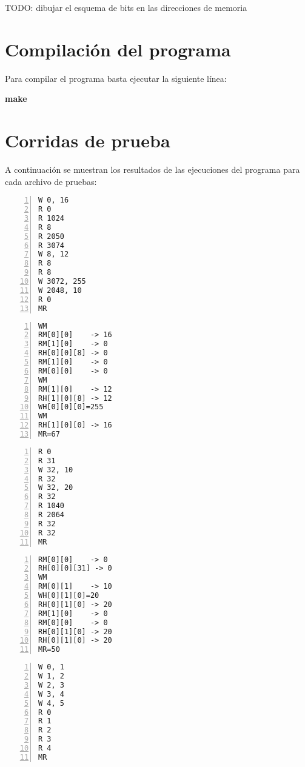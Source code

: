 \documentclass[11pt,a4paper, spanish]{article}
\begin{document}
TODO: dibujar el esquema de bits en las direcciones de memoria

\section{Compilación del programa}

Para compilar el programa basta ejecutar la siguiente línea:

\begin{center}
\textbf{make}
\end{center}

\section{Corridas de prueba}

A continuación se muestran los resultados de las ejecuciones del programa para cada archivo de pruebas:

\begin{lstlisting}[numbers=left, tabsize=2, basicstyle=\fontsize{11}{13}\ttfamily, frame=single, caption={prueba1.mem}]
W 0, 16
R 0
R 1024
R 8
R 2050
R 3074
W 8, 12
R 8
R 8
W 3072, 255
W 2048, 10
R 0
MR
\end{lstlisting}

\begin{lstlisting}[numbers=left, tabsize=2, basicstyle=\fontsize{11}{13}\ttfamily, frame=single, caption={Resultado prueba1.mem}]
WM
RM[0][0]    -> 16
RM[1][0]    -> 0
RH[0][0][8] -> 0
RM[1][0]    -> 0
RM[0][0]    -> 0
WM
RM[1][0]    -> 12
RH[1][0][8] -> 12
WH[0][0][0]=255
WM
RH[1][0][0] -> 16
MR=67
\end{lstlisting}

\begin{lstlisting}[numbers=left, tabsize=2, basicstyle=\fontsize{11}{13}\ttfamily, frame=single, caption={prueba2.mem}]
R 0
R 31
W 32, 10
R 32
W 32, 20
R 32
R 1040
R 2064
R 32
R 32
MR
\end{lstlisting}

\begin{lstlisting}[numbers=left, tabsize=2, basicstyle=\fontsize{11}{13}\ttfamily, frame=single, caption={Resultado prueba2.mem}]
RM[0][0]    -> 0
RH[0][0][31] -> 0
WM
RM[0][1]    -> 10
WH[0][1][0]=20
RH[0][1][0] -> 20
RM[1][0]    -> 0
RM[0][0]    -> 0
RH[0][1][0] -> 20
RH[0][1][0] -> 20
MR=50
\end{lstlisting}

\begin{lstlisting}[numbers=left, tabsize=2, basicstyle=\fontsize{11}{13}\ttfamily, frame=single, caption={prueba3.mem}]
W 0, 1
W 1, 2
W 2, 3
W 3, 4
W 4, 5
R 0
R 1
R 2
R 3
R 4
MR
\end{lstlisting}
\end{document}
